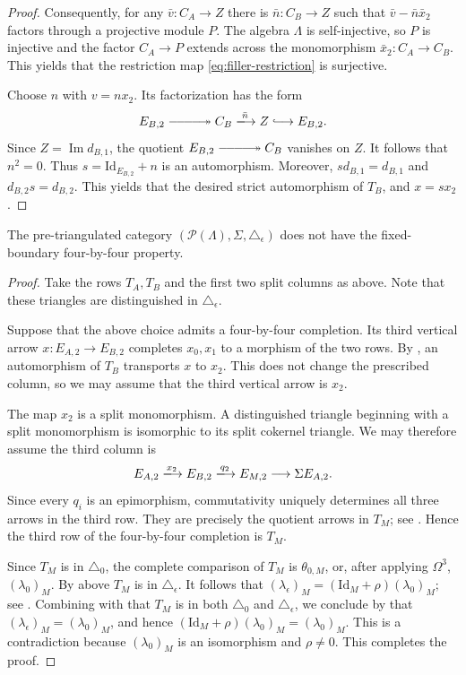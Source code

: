 \documentclass[a4paper,reqno,10pt]{amsart}
\let\shorttwoheadrightarrow\twoheadrightarrow
\renewcommand{\hookrightarrow}{\lhook\joinrel\longrightarrow}
\renewcommand{\twoheadrightarrow}{\relbar\joinrel\relbar\joinrel
\shorttwoheadrightarrow}
\numberwithin{equation}{section}
\newcommand{\Lam}{\Lambda}
\newcommand{\eps}{\epsilon}
\begin{document}
\begin{proof}
Consequently, for any $\bar v:C_A\longrightarrow Z$ there is
$\bar n:C_B\longrightarrow Z$ such that
$\bar v-\bar n\bar x_2$ factors through a projective module $P$. The
algebra $\Lam$ is self-injective, so $P$ is injective and the factor
$C_A\longrightarrow P$ extends across the monomorphism
$\bar x_2:C_A\longrightarrow C_B$. This yields that the restriction map
\eqref{eq:filler-restriction} is surjective.

Choose $n$ with $v=nx_2$. Its factorization has the form
\[
 E_{B,2}\twoheadrightarrow C_B\xlongrightarrow{\bar n}
 Z\hookrightarrow E_{B,2}.
\]
Since $Z=\operatorname{Im}d_{B,1}$, the quotient
$E_{B,2}\twoheadrightarrow C_B$
vanishes on $Z$. It follows that $n^2=0$. Thus
$s=\mathrm{Id}_{E_{B,2}}+n$ is an automorphism. Moreover,
$sd_{B,1}=d_{B,1}$ and $d_{B,2}s=d_{B,2}$. This yields that the desired
strict automorphism of $T_B$, and $x=sx_2$.
\end{proof}

\begin{theorem}\label{thm:fixed-boundary-failure}
The pre-triangulated category
$(\mathcal{P}(\Lambda),\Sigma,\triangle_\eps)$ does not have the fixed-boundary
four-by-four property.
\end{theorem}

\begin{proof}
Take the rows $T_A,T_B$ and the first two split columns
as above. Note that these triangles are distinguished in $\triangle_\eps$.

Suppose that the above choice admits a four-by-four completion. Its third
vertical arrow $x:E_{A,2}\longrightarrow E_{B,2}$ completes
$x_0,x_1$ to a morphism of the two rows. By
, an automorphism of $T_B$  transports $x$ to $x_2$. This does not
change the prescribed column, so we may assume that the third vertical
arrow is $x_2$.

The map $x_2$ is a split monomorphism. A distinguished triangle beginning
with a split monomorphism is isomorphic to its split cokernel triangle. We may therefore assume
the third column is
\[
 E_{A,2}\xlongrightarrow{x_2}E_{B,2}
 \xlongrightarrow{q_2}E_{M,2}\longrightarrow\Sigma E_{A,2}.
\]
Since every $q_i$ is an epimorphism, commutativity uniquely determines all
three arrows in the third row. They are precisely the quotient arrows in
$T_M$; see . Hence the third row of the four-by-four completion is $T_M$.

Since $T_M$ is in $\triangle_0$, the complete comparison of $T_M$ is $\theta_{0,M}$, or,
after applying $\Omega^3$, $(\lambda_0)_M$.  By above $T_M$ is in $\triangle_\eps$. It follows that
$
 (\lambda_\eps)_M=(\mathrm{Id}_M+\rho)(\lambda_0)_M;
$
see . Combining with that $T_M$ is in both $\triangle_0$ and $\triangle_\eps$, we conclude by  that $(\lambda_\eps)_M=(\lambda_0)_M$, and hence $(\mathrm{Id}_M+\rho)(\lambda_0)_M=(\lambda_0)_M$. This is a contradiction 
because $(\lambda_0)_M$ is an
isomorphism and $\rho\ne0$. This completes the proof. 
\end{proof}
\end{document}
